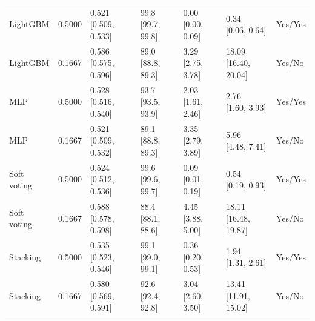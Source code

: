 \begin{table}[htbp]
{\begin{tabular}{lllllll}
LightGBM & 0.5000 & \shortstack{{0.521} \\ {[0.509, 0.533]}} & \shortstack{{99.8} \\ {[99.7, 99.8]}} & \shortstack{{0.00} \\ {[0.00, 0.09]}} & \shortstack{{0.34} \\ {[0.06, 0.64]}} & Yes/Yes \\
LightGBM & 0.1667 & \shortstack{{0.586} \\ {[0.575, 0.596]}} & \shortstack{{89.0} \\ {[88.8, 89.3]}} & \shortstack{{3.29} \\ {[2.75, 3.78]}} & \shortstack{{18.09} \\ {[16.40, 20.04]}} & Yes/No \\
MLP & 0.5000 & \shortstack{{0.528} \\ {[0.516, 0.540]}} & \shortstack{{93.7} \\ {[93.5, 93.9]}} & \shortstack{{2.03} \\ {[1.61, 2.46]}} & \shortstack{{2.76} \\ {[1.60, 3.93]}} & Yes/Yes \\
MLP & 0.1667 & \shortstack{{0.521} \\ {[0.509, 0.532]}} & \shortstack{{89.1} \\ {[88.8, 89.3]}} & \shortstack{{3.35} \\ {[2.79, 3.89]}} & \shortstack{{5.96} \\ {[4.48, 7.41]}} & Yes/No \\
Soft voting & 0.5000 & \shortstack{{0.524} \\ {[0.512, 0.536]}} & \shortstack{{99.6} \\ {[99.6, 99.7]}} & \shortstack{{0.09} \\ {[0.01, 0.19]}} & \shortstack{{0.54} \\ {[0.19, 0.93]}} & Yes/Yes \\
Soft voting & 0.1667 & \shortstack{{0.588} \\ {[0.578, 0.598]}} & \shortstack{{88.4} \\ {[88.1, 88.6]}} & \shortstack{{4.45} \\ {[3.88, 5.00]}} & \shortstack{{18.11} \\ {[16.48, 19.87]}} & Yes/No \\
Stacking & 0.5000 & \shortstack{{0.535} \\ {[0.523, 0.546]}} & \shortstack{{99.1} \\ {[99.0, 99.1]}} & \shortstack{{0.36} \\ {[0.20, 0.53]}} & \shortstack{{1.94} \\ {[1.31, 2.61]}} & Yes/Yes \\
Stacking & 0.1667 & \shortstack{{0.580} \\ {[0.569, 0.591]}} & \shortstack{{92.6} \\ {[92.4, 92.8]}} & \shortstack{{3.04} \\ {[2.60, 3.50]}} & \shortstack{{13.41} \\ {[11.91, 15.02]}} & Yes/No \\
\bottomrule
\end{tabular}
}
\end{table}
